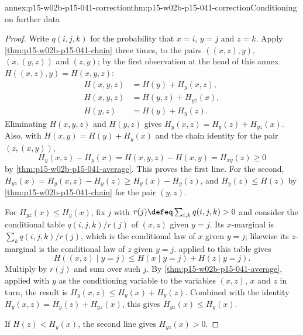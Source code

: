 \begin{annexitem}{annex:p15-w02b-p15-041-correction}{thm:p15-w02b-p15-041-correction}{Conditioning on further data}
\begin{proof}
Write \(q(i,j,k)\) for the probability that \(x=i\), \(y=j\) and
\(z=k\). Apply \cref{thm:p15-w02b-p15-041-chain} three times, to the
pairs \(((x,z),y)\), \((x,(y,z))\) and \((z,y)\); by the first
observation at the head of this annex \(H((x,z),y)=H(x,y,z)\):
\begin{align*}
 H(x,y,z)&=H(y)+H_y(x,z),\\
 H(x,y,z)&=H(y,z)+H_{yz}(x),\\
 H(y,z)&=H(y)+H_y(z).
\end{align*}
Eliminating \(H(x,y,z)\) and \(H(y,z)\) gives
\(H_y(x,z)=H_y(z)+H_{yz}(x)\). Also, with \(H(x,y)=H(y)+H_y(x)\) and
the chain identity for the pair \((z,(x,y))\),
\[
 H_y(x,z)-H_y(x)=H(x,y,z)-H(x,y)=H_{xy}(z)\geq0
\]
by \cref{thm:p15-w02b-p15-041-average}. This proves the first line.
For the second, \(H_{yz}(x)=H_y(x,z)-H_y(z)\geq H_y(x)-H_y(z)\), and
\(H_y(z)\leq H(z)\) by \cref{thm:p15-w02b-p15-041-chain} for the pair
\((y,z)\).

For \(H_{yz}(x)\leq H_y(x)\), fix \(j\) with
\(r(j)\defeq\sum_{i,k}q(i,j,k)>0\) and consider the conditional table
\(q(i,j,k)/r(j)\) of \((x,z)\) given \(y=j\). Its \(x\)-marginal is
\(\sum_kq(i,j,k)/r(j)\), which is the conditional law of \(x\) given
\(y=j\); likewise its \(z\)-marginal is the conditional law of \(z\)
given \(y=j\).  applied to
this table gives
\[
 H((x,z)\mid y=j)\leq H(x\mid y=j)+H(z\mid y=j).
\]
Multiply by \(r(j)\) and sum over such \(j\). By
\cref{thm:p15-w02b-p15-041-average}, applied with \(y\) as the
conditioning variable to the variables \((x,z)\), \(x\) and \(z\) in
turn, the result is \(H_y(x,z)\leq H_y(x)+H_y(z)\). Combined with the
identity \(H_y(x,z)=H_y(z)+H_{yz}(x)\), this gives
\(H_{yz}(x)\leq H_y(x)\).

If \(H(z)<H_y(x)\), the second line gives \(H_{yz}(x)>0\).
\end{proof}
\end{annexitem}

